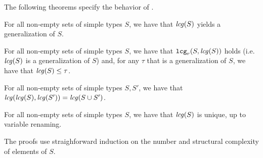 The following theorems specify the behavior of \lcg.

\begin{Theorem}
For all non-empty sets of simple types $S$, we have that ${\it lcg\/}(S)$
yields a generalization of $S$.
\label{theorem:lcg-is-sound}
\end{Theorem}

\begin{Theorem}
For all non-empty sets of simple types $S$, we have that
${\tt lcg}_r(S,{\it lcg\/}(S))$ holds (i.e.~${\it lcg\/}(S)$ is a generalization of $S$)
and, for any $\tau$ that is a generalization of $S$, we have that
${\it lcg\/}(S) \leq \tau$.
\label{theorem:lcg-is-complete}
\end{Theorem}

\begin{Theorem}
For all non-empty sets of simple types $S, S'$, we have that
${\it lcg\/}({\it lcg\/}(S),{\it lcg\/}(S')) = {\it lcg\/}(S \cup S')$.
\label{theorem:lcg-is-compositional}
\end{Theorem}

\begin{Theorem}
For all non-empty sets of simple types $S$, we have that ${\it lcg\/}(S)$ is
unique, up to variable renaming.
\label{theorem:lcg-is-unique-modulo-variable-renaming}
\end{Theorem}

The proofs use straighforward induction on the number and structural
complexity of elements of $S$.


